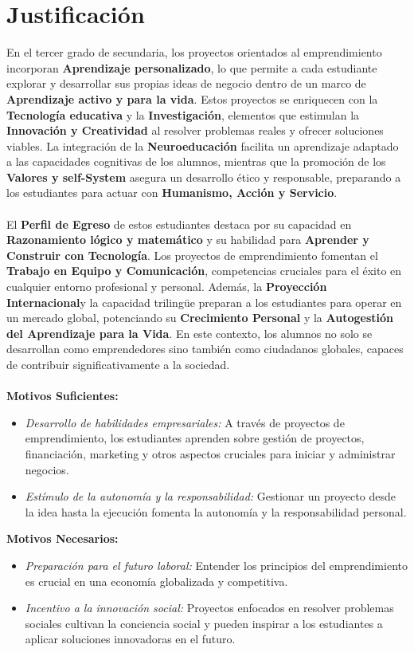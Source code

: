 \section{Justificación}
En el tercer grado de secundaria, los proyectos orientados al emprendimiento incorporan \textbf{Aprendizaje personalizado}, lo que permite a cada estudiante explorar y desarrollar sus propias ideas de negocio dentro de un marco de \textbf{Aprendizaje activo y para la vida}. Estos proyectos se enriquecen con la \textbf{Tecnología educativa} y la \textbf{Investigación}, elementos que estimulan la \textbf{Innovación y Creatividad} al resolver problemas reales y ofrecer soluciones viables. La integración de la \textbf{Neuroeducación} facilita un aprendizaje adaptado a las capacidades cognitivas de los alumnos, mientras que la promoción de los \textbf{Valores y self-System} asegura un desarrollo ético y responsable, preparando a los estudiantes para actuar con \textbf{Humanismo, Acción y Servicio}.
\\ \\ 
El \textbf{Perfil de Egreso} de estos estudiantes destaca por su capacidad en \textbf{Razonamiento lógico y matemático} y su habilidad para \textbf{Aprender y Construir con Tecnología}. Los proyectos de emprendimiento fomentan el \textbf{Trabajo en Equipo y Comunicación}, competencias cruciales para el éxito en cualquier entorno profesional y personal. Además, la \textbf{Proyección Internacional}y la capacidad trilingüe preparan a los estudiantes para operar en un mercado global, potenciando su \textbf{Crecimiento Personal} y la \textbf{Autogestión del Aprendizaje para la Vida}. En este contexto, los alumnos no solo se desarrollan como emprendedores sino también como ciudadanos globales, capaces de contribuir significativamente a la sociedad.
\\ \\ 
\textbf{Motivos Suficientes:} \\
\begin{itemize}
    \item \textit{Desarrollo de habilidades empresariales:}
    A través de proyectos de emprendimiento, los estudiantes aprenden sobre gestión de proyectos, financiación, marketing y otros aspectos cruciales para iniciar y administrar negocios.
    \item \textit{Estímulo de la autonomía y la responsabilidad: }
    Gestionar un proyecto desde la idea hasta la ejecución fomenta la autonomía y la responsabilidad personal.
\end{itemize}
\textbf{Motivos Necesarios:}
\begin{itemize}
    \item \textit{Preparación para el futuro laboral: }
     Entender los principios del emprendimiento es crucial en una economía globalizada y competitiva.
     \item \textit{Incentivo a la innovación social: }
    Proyectos enfocados en resolver problemas sociales cultivan la conciencia social y pueden inspirar a los estudiantes a aplicar soluciones innovadoras en el futuro.
\end{itemize}
\newpage
